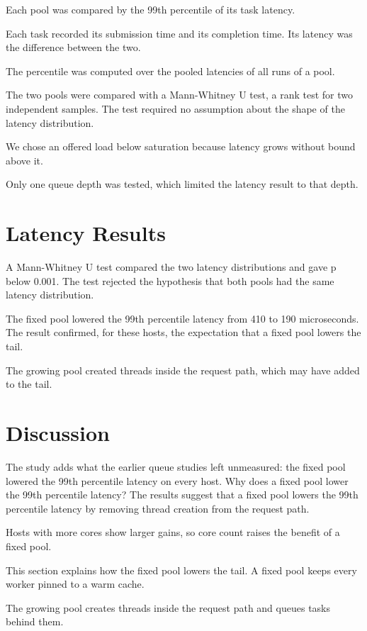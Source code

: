Each pool was compared by the 99th percentile of its task latency.

Each task recorded its submission time and its completion time. Its latency was the difference between the two.

The percentile was computed over the pooled latencies of all runs of a pool.

The two pools were compared with a Mann-Whitney U test, a rank test for two independent samples. The test required no assumption about the shape of the latency distribution.

We chose an offered load below saturation because latency grows without bound above it.

Only one queue depth was tested, which limited the latency result to that depth.

\section{Latency Results}

A Mann-Whitney U test compared the two latency distributions and gave p below 0.001. The test rejected the hypothesis that both pools had the same latency distribution.

The fixed pool lowered the 99th percentile latency from 410 to 190 microseconds. The result confirmed, for these hosts, the expectation that a fixed pool lowers the tail.

The growing pool created threads inside the request path, which may have added to the tail.

\section{Discussion}

The study adds what the earlier queue studies left unmeasured: the fixed pool lowered the 99th percentile latency on every host. Why does a fixed pool lower the 99th percentile latency? The results suggest that a fixed pool lowers the 99th percentile latency by removing thread creation from the request path.

Hosts with more cores show larger gains, so core count raises the benefit of a fixed pool.

This section explains how the fixed pool lowers the tail. A fixed pool keeps every worker pinned to a warm cache.

The growing pool creates threads inside the request path and queues tasks behind them.

